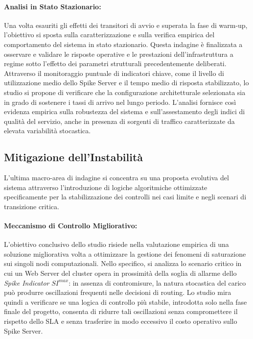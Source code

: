 ﻿\documentclass[a4paper,12pt]{article}
\begin{document}
\paragraph{Analisi in Stato Stazionario:}
Una volta esauriti gli effetti dei transitori di avvio e superata la fase di warm-up, l'obiettivo si sposta sulla caratterizzazione e sulla verifica empirica del comportamento del sistema in stato stazionario. Questa indagine è finalizzata a osservare e validare le risposte operative e le prestazioni dell'infrastruttura a regime sotto l'effetto dei parametri strutturali precedentemente deliberati. Attraverso il monitoraggio puntuale di indicatori chiave, come il livello di utilizzazione medio dello Spike Server e il tempo medio di risposta stabilizzato, lo studio si propone di verificare che la configurazione architetturale selezionata sia in grado di sostenere i tassi di arrivo nel lungo periodo. L'analisi fornisce così evidenza empirica sulla robustezza del sistema e sull'assestamento degli indici di qualità del servizio, anche in presenza di sorgenti di traffico caratterizzate da elevata variabilità stocastica.


\subsection{Mitigazione dell'Instabilità}
L'ultima macro-area di indagine si concentra su una proposta evolutiva del sistema attraverso l'introduzione di logiche algoritmiche ottimizzate specificamente per la stabilizzazione dei controlli nei casi limite e negli scenari di transizione critica.

\paragraph{Meccanismo di Controllo Migliorativo:}
L'obiettivo conclusivo dello studio risiede nella valutazione empirica di una soluzione migliorativa volta a ottimizzare la gestione dei fenomeni di saturazione sui singoli nodi computazionali. Nello specifico, si analizza lo scenario critico in cui un Web Server del cluster opera in prossimità della soglia di allarme dello \textit{Spike Indicator} $SI^{max}$: in assenza di contromisure, la natura stocastica del carico può produrre oscillazioni frequenti nelle decisioni di routing. Lo studio mira quindi a verificare se una logica di controllo più stabile, introdotta solo nella fase finale del progetto, consenta di ridurre tali oscillazioni senza compromettere il rispetto dello SLA e senza trasferire in modo eccessivo il costo operativo sullo Spike Server.
\end{document}
